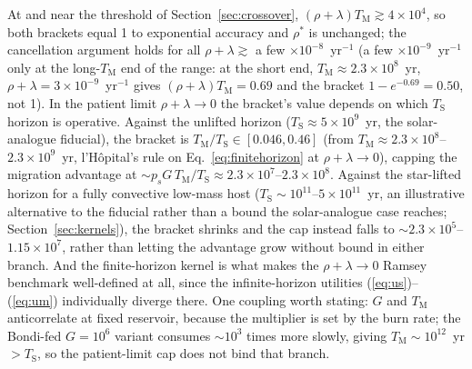 \documentclass[11pt]{article}
\begin{document}
At and near the threshold of Section~\ref{sec:crossover}, $(\rho+\lambda)T_{\mathrm M} \gtrsim 4\times10^{4}$, so both brackets equal 1 to exponential accuracy and $\rho^{*}$ is unchanged; the cancellation argument holds for all $\rho + \lambda \gtrsim$ a few $\times10^{-8}$~yr$^{-1}$ (a few $\times10^{-9}$~yr$^{-1}$ only at the long-$T_{\mathrm M}$ end of the range: at the short end, $T_{\mathrm M} \approx 2.3\times10^{8}$~yr, $\rho+\lambda = 3\times10^{-9}$~yr$^{-1}$ gives $(\rho+\lambda)T_{\mathrm M} = 0.69$ and the bracket $1-e^{-0.69} = 0.50$, not 1). In the patient limit $\rho + \lambda \to 0$ the bracket's value depends on which $T_{\mathrm S}$ horizon is operative. Against the unlifted horizon ($T_{\mathrm S} \approx 5\times10^{9}$~yr, the solar-analogue fiducial), the bracket is $T_{\mathrm M}/T_{\mathrm S} \in [0.046, 0.46]$ (from $T_{\mathrm M} \approx 2.3\times10^{8}$--$2.3\times10^{9}$~yr, l'Hôpital's rule on Eq.~\ref{eq:finitehorizon} at $\rho+\lambda \to 0$), capping the migration advantage at $\sim$$p_{s} G\, T_{\mathrm M}/T_{\mathrm S} \approx 2.3\times10^{7}$--$2.3\times10^{8}$. Against the star-lifted horizon for a fully convective low-mass host ($T_{\mathrm S} \sim 10^{11}$--$5\times10^{11}$~yr, an illustrative alternative to the fiducial rather than a bound the solar-analogue case reaches; Section~\ref{sec:kernels}), the bracket shrinks and the cap instead falls to $\sim2.3\times10^{5}$--$1.15\times10^{7}$, rather than letting the advantage grow without bound in either branch. And the finite-horizon kernel is what makes the $\rho + \lambda \to 0$ Ramsey benchmark well-defined at all, since the infinite-horizon utilities (\ref{eq:us})--(\ref{eq:um}) individually diverge there. One coupling worth stating: $G$ and $T_{\mathrm M}$ anticorrelate at fixed reservoir, because the multiplier is set by the burn rate; the Bondi-fed $G = 10^{6}$ variant consumes $\sim$$10^{3}$ times more slowly, giving $T_{\mathrm M} \sim 10^{12}$~yr $> T_{\mathrm S}$, so the patient-limit cap does not bind that branch.
\end{document}
